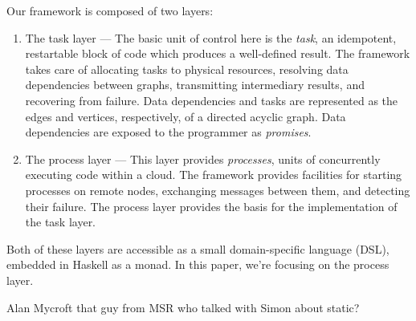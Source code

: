 \documentclass[preprint]{sigplanconf}
\begin{document}
Our framework is composed of two layers:

\begin{enumerate}
\item The task layer --- The basic unit of control here is the {\em task}, an idempotent, restartable block of code which produces a well-defined result. The framework takes care of allocating tasks to physical resources, resolving data dependencies between graphs, transmitting intermediary results, and recovering from failure. Data dependencies and tasks are represented as the edges and vertices, respectively, of a directed acyclic graph. Data dependencies are exposed to the programmer as {\em promises}.
\item The process layer --- This layer provides {\em processes}, units of concurrently executing code within a cloud. The framework provides facilities for starting processes on remote nodes, exchanging messages between them, and detecting their failure. The process layer provides the basis for the implementation of the task layer.
\end{enumerate}

Both of these layers are accessible as a small domain-specific language (DSL), embedded in Haskell as a monad. In this paper, we're focusing on the process layer.


\acks

Alan Mycroft
that guy from MSR who talked with Simon about static?





%
%
%
\end{document}
